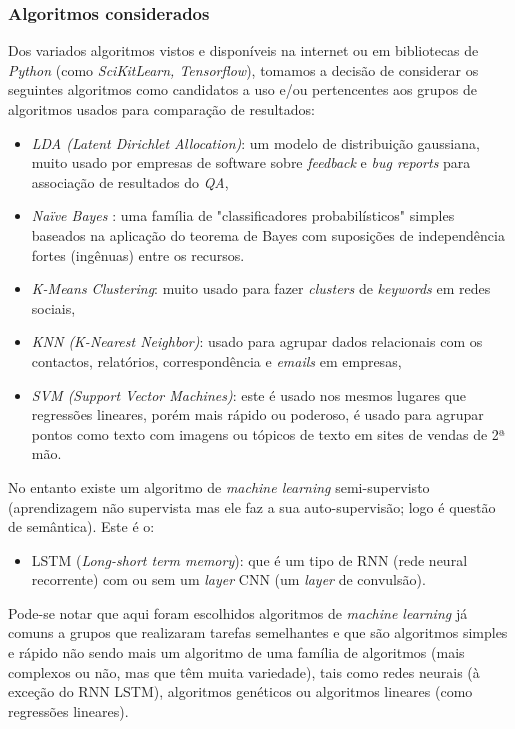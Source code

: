 \subsubsection{Algoritmos considerados}

Dos variados algoritmos vistos e disponíveis na internet ou em bibliotecas de \textit{Python} (como \textit{SciKitLearn, Tensorflow}), tomamos a decisão de considerar os seguintes algoritmos como candidatos a uso e/ou pertencentes aos grupos de algoritmos usados para comparação de resultados:
\begin{itemize}
  \setlength\itemsep{0.05em}
  \item \textit{LDA (Latent Dirichlet Allocation)}: um modelo de distribuição gaussiana, muito usado por empresas de software sobre \textit{feedback} e \textit{bug reports} para associação de resultados do \textit{QA},
  \item \textit{Naïve Bayes} \cite{mbn1}: uma família de "classificadores probabilísticos" simples baseados na aplicação do teorema de Bayes com suposições de independência fortes (ingênuas) entre os recursos.
  \item \textit{K-Means Clustering}: muito usado para fazer \textit{clusters} de \textit{keywords} em redes sociais,
  \item \textit{KNN (K-Nearest Neighbor)}: usado para agrupar dados relacionais com os contactos, relatórios, correspondência e \textit{emails} em empresas,
  \item \textit{SVM (Support Vector Machines)}: este é usado nos mesmos lugares que regressões lineares, porém mais rápido ou poderoso, é usado para agrupar pontos como texto com imagens ou tópicos de texto em sites de vendas de 2ª mão.
\end{itemize}

No entanto existe um algoritmo de \textit{machine learning} semi-supervisto (aprendizagem não supervista mas ele faz a sua auto-supervisão; logo é questão de semântica).
Este é o:
\begin{itemize}
  \setlength\itemsep{0.05em}
  \item LSTM (\textit{Long-short term memory}): que é um tipo de RNN (rede neural recorrente) com ou sem um \textit{layer} CNN (um \textit{layer} de convulsão).
\end{itemize}

Pode-se notar que aqui foram escolhidos algoritmos de \textit{machine learning} já comuns a grupos que realizaram tarefas semelhantes e que são algoritmos simples e rápido não sendo mais um algoritmo de uma família de algoritmos (mais complexos ou não, mas que têm muita variedade), tais como redes neurais (à exceção do RNN LSTM), algoritmos genéticos ou algoritmos lineares (como regressões lineares).

